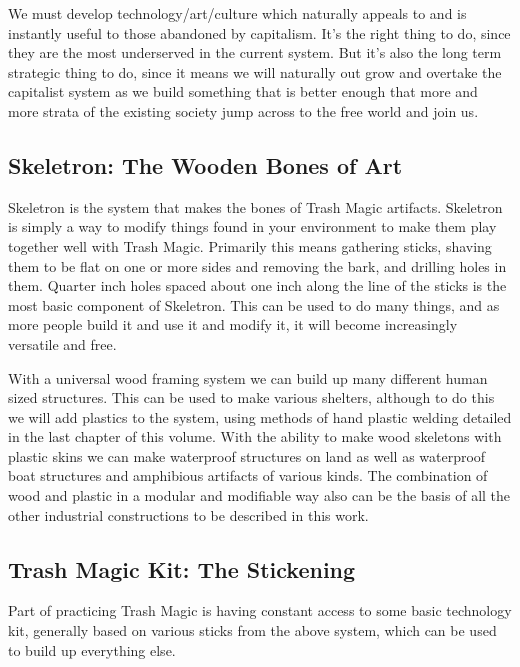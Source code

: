 We must develop technology/art/culture which naturally appeals to and is
instantly useful to those abandoned by capitalism. It's the right thing
to do, since they are the most underserved in the current system. But
it's also the long term strategic thing to do, since it means we will
naturally out grow and overtake the capitalist system as we build
something that is better enough that more and more strata of the
existing society jump across to the free world and join us.

\subsection{Skeletron: The Wooden Bones of
Art}\label{skeletron-the-wooden-bones-of-art}

Skeletron is the system that makes the bones of Trash Magic artifacts.
Skeletron is simply a way to modify things found in your environment to
make them play together well with Trash Magic. Primarily this means
gathering sticks, shaving them to be flat on one or more sides and
removing the bark, and drilling holes in them. Quarter inch holes spaced
about one inch along the line of the sticks is the most basic component
of Skeletron. This can be used to do many things, and as more people
build it and use it and modify it, it will become increasingly versatile
and free.

With a universal wood framing system we can build up many different
human sized structures. This can be used to make various shelters,
although to do this we will add plastics to the system, using methods of
hand plastic welding detailed in the last chapter of this volume. With
the ability to make wood skeletons with plastic skins we can make
waterproof structures on land as well as waterproof boat structures and
amphibious artifacts of various kinds. The combination of wood and
plastic in a modular and modifiable way also can be the basis of all the
other industrial constructions to be described in this work.

\subsection{Trash Magic Kit: The
Stickening}\label{trash-magic-kit-the-stickening}

Part of practicing Trash Magic is having constant access to some basic
technology kit, generally based on various sticks from the above system,
which can be used to build up everything else.

